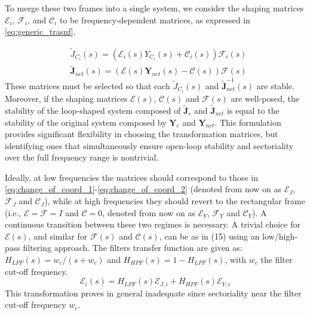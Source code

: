 To merge these two frames into a single system, we consider the shaping matrices $\mathcal{E}_i$, $\mathcal{F}_i$, and $\mathcal{C}_i$ to be frequency-dependent matrices, as expressed in \eqref{eq:generic_trasnf}.

\begin{equation}
\begin{aligned}
    &\tilde{J}_{C_i}(s) =(\mathcal{E}_i(s)Y_{C_i}(s)+\mathcal{C}_i(s))\mathcal{F}_i(s) \\
    &\tilde{\mathbf{J}}_{net}(s) =(\boldsymbol{\mathcal{E}}(s)\mathbf{Y}_{net}(s)-\boldsymbol{\mathcal{C}}(s))\boldsymbol{\mathcal{F}}(s)
    \label{eq:generic_trasnf}
\end{aligned}
\end{equation}
These matrices must be selected so that each $\tilde{J}_{C_i}(s)$ and $\tilde{\mathbf{J}}^{-1}_{net}(s)$ are stable.
Moreover, if the shaping matrices $\boldsymbol{\mathcal{E}}(s)$, $\boldsymbol{\mathcal{C}}(s)$ and $\boldsymbol{\mathcal{F}}(s)$ are well-posed, the stability of the loop-shaped system composed of $\tilde{\mathbf{J}}_{c}$ and $\tilde{\mathbf{J}}_{net}$ is equal to the stability of the original system composed by $\mathbf{Y}_{c}$ and $\mathbf{Y}_{net}$. 
This formulation provides significant flexibility in choosing the transformation matrices, but identifying ones that simultaneously ensure open-loop stability and sectoriality over the full frequency range is nontrivial.


Ideally, at low frequencies the matrices should correspond to those in \eqref{eq:change_of_coord_1}-\eqref{eq:change_of_coord_2} (denoted from now on as $\mathcal{E}_J$, $\mathcal{F}_J$ and $\mathcal{C}_J$), while at high frequencies they should revert to the rectangular frame (i.e., $\mathcal{E}=\mathcal{F}=I$ and $\mathcal{C}=0$, denoted from now on as $\mathcal{E}_Y$, $\mathcal{F}_Y$ and $\mathcal{C}_Y$). A continuous transition between these two regimes is necessary. A trivial choice for $\mathcal{E}(s)$, and similar for $\mathcal{F}(s)$ and $\mathcal{C}(s)$, can be as in (15) using an low/high-pass filtering approach. 
The filters transfer function are given as: $H_{LPF}(s)=w_c/(s+w_c)$ and $H_{HPF}(s)=1-H_{LPF}(s)$, with $w_c$ the filter cut-off frequency. 
\begin{equation}
    \mathcal{E}_i(s) = H_{LPF}(s)\mathcal{E}_{J,i}+H_{HPF}(s)\mathcal{E}_{Y,i}
    \label{eq:freq_dep_tf}
\end{equation}
This transformation proves in general inadequate since sectoriality near the filter cut-off frequency $w_c$. 

